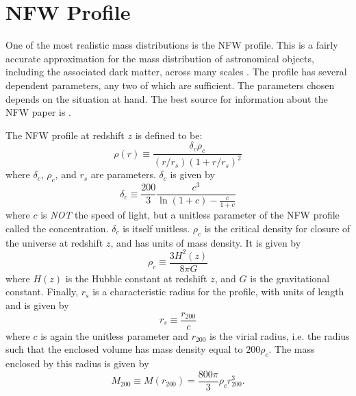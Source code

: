 \documentclass[10pt,twoside]{article}
\theoremstyle{definition}
\theoremstyle{exercise}
\begin{document}
\section{NFW Profile}

One of the most realistic mass distributions is the NFW profile. This is a fairly accurate approximation for the mass distribution of astronomical objects, including the associated dark matter, across many scales \cite{Navarro:1995iw}. The profile has several dependent parameters, any two of which are sufficient. The parameters chosen depends on the situation at hand. The best source for information about the NFW paper is \cite{brainerd_wright}.

The NFW profile at redshift $z$ is defined to be: \cite{brainerd_wright}
\begin{equation}
		\rho(r) \equiv \frac{\delta_c \rho_c}{(r/r_s)(1+r/r_s)^2}
		\label{eq:NFW_profile}
\end{equation}
where $\delta_c$, $\rho_c$, and $r_s$ are parameters. $\delta_c$ is given by
\begin{equation}
		\delta_c \equiv \frac{200}{3} \frac{c^3}{\ln(1+c) - \frac{c}{1+c}}
		\label{eq:delta_c}
\end{equation}
where $c$ is \emph{NOT} the speed of light, but a unitless parameter of the NFW profile called the concentration. $\delta_c$ is itself unitless. $\rho_c$ is the critical density for closure of the universe at redshift $z$, and has units of mass density. It is given by
\begin{equation}
		\rho_c \equiv \frac{3H^2(z)}{8\pi G}
		\label{eq:rho_c}
\end{equation}
where $H(z)$ is the Hubble constant at redshift $z$, and $G$ is the gravitational constant. Finally, $r_s$ is a characteristic radius for the profile, with units of length and is given by
\begin{equation}
		r_s \equiv \frac{r_{200}}{c}
		\label{eq:r_s}
\end{equation}
where $c$ is again the unitless parameter and $r_{200}$ is the virial radius, i.e. the radius such that the enclosed volume has mass density equal to $200 \rho_c$. The mass enclosed by this radius is given by 
\begin{equation}
		M_{200} \equiv M(r_{200}) = \frac{800 \pi}{3} \rho_c r_{200}^3.
		\label{eq:m_200}
\end{equation}
\end{document}
